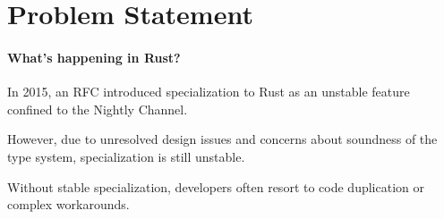 \section{Problem Statement}\label{sec:problem_statement}


\begin{frame}{\secname}
	\framesubtitle{What's happening in Rust?}

	In 2015, an RFC introduced specialization to Rust as an unstable feature confined to the \alert{Nightly Channel}. %

	\bigskip

	However, due to unresolved design issues and concerns about soundness of the type system, %
	specialization is still unstable.

	\bigskip

	Without stable specialization, developers often resort to code duplication or complex workarounds.

\end{frame}


